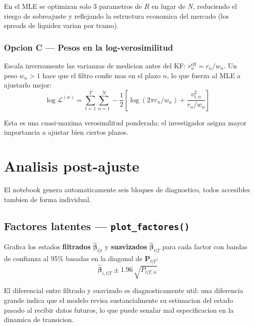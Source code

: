 \documentclass[12pt, a4paper]{article}
\theoremstyle{plain}
\theoremstyle{definition}
\theoremstyle{remark}
\newcommand{\bbet}{\bm{\beta}}
\newcommand{\bP}{\mathbf{P}}
\begin{document}
En el MLE se optimizan solo 3 parametros de $R$ en lugar de $N$,
reduciendo el riesgo de sobreajuste y reflejando la estructura economica
del mercado (los spreads de liquidez varian por tramo).

\subsubsection{Opcion C --- Pesos en la log-verosimilitud}

Escala inversamente las varianzas de medicion antes del KF:
$r_n^\text{eff} = r_n / w_n$. Un peso $w_n > 1$ hace que el filtro
confie mas en el plazo $n$, lo que fuerza al MLE a ajustarlo mejor:
\begin{equation}
  \log\mathcal{L}^{(w)} =
  \sum_{t=1}^T \sum_{n=1}^N
  -\frac{1}{2}\!\left[\log(2\pi r_n / w_n) + \frac{v_{t,n}^2}{r_n/w_n}\right]
  \label{eq:loglik_weighted}
\end{equation}

Esta es una cuasi-maxima verosimilitud ponderada: el investigador asigna
mayor importancia a ajustar bien ciertos plazos.

\section{Analisis post-ajuste}
\label{sec:postfit}

El notebook genera automaticamente seis bloques de diagnostico,
todos accesibles tambien de forma individual.

\subsection{Factores latentes --- \texttt{plot\_factores()}}

Grafica los estados \textbf{filtrados} $\hat{\bbet}_{t|t}$ y
\textbf{suavizados} $\hat{\bbet}_{t|T}$ para cada factor con
bandas de confianza al 95\% basadas en la diagonal de $\bP_{t|T}$:
\begin{equation}
  \hat{\bbet}_{i,t|T} \pm 1.96\,\sqrt{P_{t|T,ii}}
  \label{eq:ic_factors}
\end{equation}

El diferencial entre filtrado y suavizado es diagnosticamente util:
una diferencia grande indica que el modelo revisa sustancialmente
su estimacion del estado pasado al recibir datos futuros, lo que
puede senalar mal especificacion en la dinamica de transicion.
\end{document}
